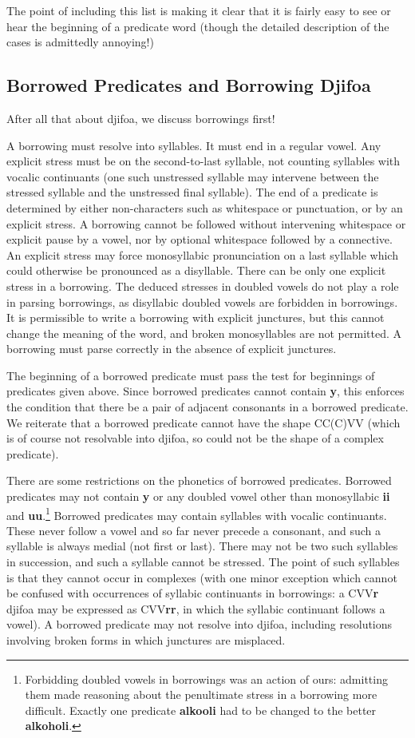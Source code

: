 \documentclass[12pt]{book}
\begin{document}
{The point of including this list is making it clear that it is fairly easy to see or hear the beginning of a predicate word (though the detailed description of the cases is admittedly annoying!)

\subsection{Borrowed Predicates and Borrowing Djifoa}

After all that about djifoa, we discuss borrowings first!

A borrowing must resolve into syllables.  It must end in a regular vowel.  Any explicit stress must be on the second-to-last syllable, not counting syllables with vocalic continuants (one such unstressed syllable may intervene between the stressed syllable and the unstressed final syllable).     The end of a predicate is determined by either non-characters such as whitespace or punctuation, or by an explicit stress.  A borrowing cannot be followed without intervening whitespace or explicit pause by a vowel, nor by optional whitespace followed by a connective.  An explicit stress  may force monosyllabic pronunciation on a last syllable which could otherwise be pronounced as a disyllable.   There can be only one explicit stress in a borrowing.  The deduced stresses in doubled vowels do not play a role in parsing borrowings, as disyllabic doubled vowels are forbidden in borrowings.  It is permissible to write a borrowing with explicit junctures, but this cannot change the meaning of the word, and broken monosyllables are not permitted.  A borrowing must parse correctly in the absence of explicit junctures.

The beginning of a borrowed predicate must pass the test for beginnings of predicates given above.  Since borrowed predicates cannot contain {\bf y}, this enforces the condition that there be a pair of adjacent consonants in a borrowed predicate.  We reiterate that a borrowed predicate cannot have the shape CC(C)VV (which is of course not resolvable into djifoa, so could not be the shape of a complex predicate).

There are some restrictions on the phonetics of borrowed predicates.  Borrowed predicates may not contain {\bf y} or any doubled vowel other than monosyllabic {\bf ii} and {\bf uu}.\footnote{Forbidding doubled vowels in borrowings was an action of ours:  admitting them made reasoning about the penultimate stress in a borrowing more difficult.  Exactly one predicate {\bf alkooli} had to be changed to the better {\bf alkoholi}.}
Borrowed predicates may contain syllables with vocalic continuants.  These never follow a vowel and so far never precede a consonant, and such a syllable is always medial (not first or last).  There may not be two such syllables in succession, and such a syllable cannot be stressed. The point of such syllables is that they cannot occur in complexes (with one minor exception which cannot be confused with occurrences of syllabic continuants in borrowings:  a CVV{\bf r} djifoa may be expressed as CVV{\bf rr}, in which the syllabic continuant follows a vowel).  A borrowed predicate may not resolve into djifoa, including resolutions involving broken forms in which junctures are misplaced.

}
\end{document}

